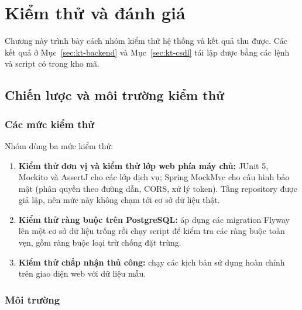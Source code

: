 \chapter{Kiểm thử và đánh giá}
\label{ch:kiem-thu-danh-gia}

Chương này trình bày cách nhóm kiểm thử hệ thống và kết quả thu được. Các kết quả ở Mục~\ref{sec:kt-backend} và Mục~\ref{sec:kt-csdl} tái lập được bằng các lệnh và script có trong kho mã.

\section{Chiến lược và môi trường kiểm thử}
\label{sec:kt-chien-luoc}

\subsection{Các mức kiểm thử}
Nhóm dùng ba mức kiểm thử:
\begin{enumerate}
    \item \textbf{Kiểm thử đơn vị và kiểm thử lớp web phía máy chủ:} JUnit 5, Mockito và AssertJ cho các lớp dịch vụ; Spring MockMvc cho cấu hình bảo mật (phân quyền theo đường dẫn, CORS, xử lý token). Tầng repository được giả lập, nên mức này không chạm tới cơ sở dữ liệu thật.
    \item \textbf{Kiểm thử ràng buộc trên PostgreSQL:} áp dụng các migration Flyway lên một cơ sở dữ liệu trống rồi chạy script  để kiểm tra các ràng buộc toàn vẹn, gồm ràng buộc loại trừ chống đặt trùng.
    \item \textbf{Kiểm thử chấp nhận thủ công:} chạy các kịch bản sử dụng hoàn chỉnh trên giao diện web với dữ liệu mẫu.
\end{enumerate}

\subsection{Môi trường}

